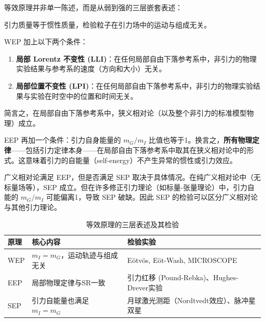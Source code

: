等效原理并非单一陈述，而是从弱到强的三层嵌套表述：

\begin{definition}
引力质量等于惯性质量，检验粒子在引力场中的运动与组成无关。
\end{definition}

\begin{definition}
WEP 加上以下两个条件：
\begin{enumerate}
    \item \textbf{局部 Lorentz 不变性 (LLI)}：在任何局部自由下落参考系中，非引力的物理实验结果与参考系的速度（方向和大小）无关。
    \item \textbf{局部位置不变性 (LPI)}：在任何局部自由下落参考系中，非引力的物理实验结果与实验在时空中的位置和时间无关。
\end{enumerate}
简言之，在局部自由下落参考系中，狭义相对论（以及整个非引力的标准模型物理）成立。
\end{definition}

\begin{definition}
EEP 再加一个条件：引力自身能量的 $m_G/m_I$ 比值也等于1。换言之，\textbf{所有物理定律}——包括引力定律本身——在局部自由下落参考系中取其在狭义相对论中的形式。这意味着引力的自能量（self-energy）不产生异常的惯性或引力效应。
\end{definition}

\begin{note}
广义相对论满足 EEP，但是否满足 SEP 取决于具体情况。在纯广义相对论中（无标量场等），SEP 成立。但在许多修正引力理论（如标量-张量理论）中，引力自能的 $m_G/m_I$ 可能偏离1，导致 SEP 破缺。因此 SEP 的检验可以区分广义相对论与其他引力理论。
\end{note}

\begin{table}[htbp]
\centering
\caption{等效原理的三层表述及其检验}
\begin{tabular}{p{2.5cm} p{5cm} p{5cm}}
\toprule
\textbf{原理} & \textbf{核心内容} & \textbf{检验实验} \\
\midrule
WEP & $m_I=m_G$，运动轨迹与组成无关 & E\"{o}tv\"{o}s, E\"{o}t-Wash, MICROSCOPE \\
EEP & 局部物理定律与SR一致 & 引力红移 (Pound-Rebka)、Hughes-Drever实验 \\
SEP & 引力自能量也满足 $m_I=m_G$ & 月球激光测距（Nordtvedt效应）、脉冲星双星 \\
\bottomrule
\end{tabular}
\label{tab:ep_levels}
\end{table}

